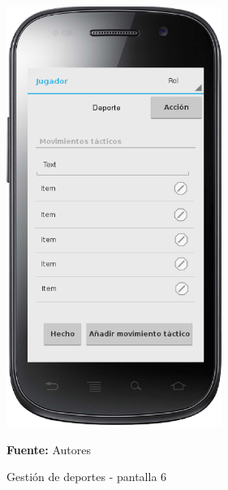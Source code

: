 \begin{figure}[!htb]
  \begin{center}
    \includegraphics[width=7cm]{./imagenes/UI/Deportes/gestion_deportes_6.png}
    \caption{Gestión de deportes - pantalla 6}
    \label{fig:gestion_deportes_6}
    \textbf{Fuente:}  Autores
  \end{center}
\end{figure}

